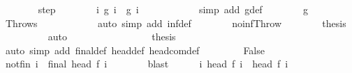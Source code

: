 \begin{isabellebody}
\ \ \ \ \ \ \isamarkupfalse%
\ step\isanewline
\ \ \ \ \ \ \isamarkupfalse%
\ {\isachardoublequoteopen}{\isasymforall}i{\isachardot}\ {\isasymGamma}{\isasymturnstile}g\ i\ {\isasymrightarrow}\ g\ {\isacharparenleft}i\ {\isacharplus}\ {}{\isacharparenright}{\isachardoublequoteclose}\isanewline
\ \ \ \ \ \ \ \ \isamarkupfalse%
\ {\isacharparenleft}simp\ add{\isacharcolon}\ g{\isacharunderscore}def{\isacharparenright}\isanewline
\ \ \ \ \ \ \isamarkupfalse%
\ g{\isacharunderscore}{}\ \isamarkupfalse%
\ {\isachardoublequoteopen}{\isasymGamma}{\isasymturnstile}{\isacharparenleft}Throw{\isacharcomma}s{\isacharprime}{\isacharparenright}\ {\isasymrightarrow}\ {\isasymdots}{\isacharparenleft}{\isasyminfinity}{\isacharparenright}{\isachardoublequoteclose}\isanewline
\ \ \ \ \ \ \ \ \isamarkupfalse%
\ {\isacharparenleft}auto\ simp\ add{\isacharcolon}\ inf{\isacharunderscore}def{\isacharparenright}\isanewline
\ \ \ \ \ \ \isamarkupfalse%
\ no{\isacharunderscore}inf{\isacharunderscore}Throw\isanewline
\ \ \ \ \ \ \isamarkupfalse%
\ {\isacharquery}thesis\isanewline
\ \ \ \ \ \ \ \ \isamarkupfalse%
\ auto\isanewline
\ \ \ \ \isacommand{{\isacharbraceright}}\isamarkupfalse%
\isanewline
\ \ \ \ \isamarkupfalse%
\ \isanewline
\ \ \ \ \isamarkupfalse%
\ {\isacharquery}thesis\isanewline
\ \ \ \ \ \ \isamarkupfalse%
\ {\isacharparenleft}auto\ simp\ add{\isacharcolon}\ final{\isacharunderscore}def\ head{\isacharunderscore}def\ head{\isacharunderscore}com{\isacharunderscore}def{\isacharparenright}\isanewline
\ \ \isamarkupfalse%
\isanewline
\ \ \ \ \isamarkupfalse%
\ False\isanewline
\ \ \ \ \isamarkupfalse%
\ \isamarkupfalse%
\ not{\isacharunderscore}fin{\isacharcolon}\ {\isachardoublequoteopen}{\isasymforall}i{\isachardot}\ {\isasymnot}\ final\ {\isacharparenleft}head\ {\isacharparenleft}f\ i{\isacharparenright}{\isacharparenright}{\isachardoublequoteclose}\isanewline
\ \ \ \ \ \ \isamarkupfalse%
\ blast\isanewline
\ \ \ \ \isamarkupfalse%
\ {\isachardoublequoteopen}{\isasymforall}i{\isachardot}\ {\isasymGamma}{\isasymturnstile}head\ {\isacharparenleft}f\ i{\isacharparenright}\ {\isasymrightarrow}\ head\ {\isacharparenleft}f\ {\isacharparenleft}i\ {\isacharplus}\ {}{\isacharparenright}{\isacharparenright}{\isachardoublequoteclose}\isanewline
\ \ \ \ \isamarkupfalse%

\end{isabellebody}
